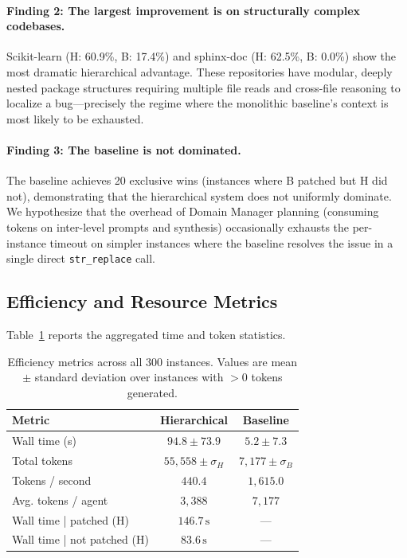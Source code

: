 \paragraph{Finding 2: The largest improvement is on structurally complex codebases.}
Scikit-learn (H: 60.9\%, B: 17.4\%) and sphinx-doc (H: 62.5\%, B: 0.0\%)
show the most dramatic hierarchical advantage. These repositories have
modular, deeply nested package structures requiring multiple file reads
and cross-file reasoning to localize a bug---precisely the regime where
the monolithic baseline's context is most likely to be exhausted.

\paragraph{Finding 3: The baseline is not dominated.}
The baseline achieves 20 exclusive wins (instances where B patched but H
did not), demonstrating that the hierarchical system does not uniformly
dominate. We hypothesize that the overhead of Domain Manager planning
(consuming tokens on inter-level prompts and synthesis) occasionally
exhausts the per-instance timeout on simpler instances where the baseline
resolves the issue in a single direct \texttt{str\_replace} call.

\subsection{Efficiency and Resource Metrics}
\label{sec:results:efficiency}

Table~\ref{tab:efficiency} reports the aggregated time and token statistics.

\begin{table}[t]
\centering
\caption{Efficiency metrics across all 300 instances. Values are
mean $\pm$ standard deviation over instances with $>0$ tokens generated.}
\label{tab:efficiency}
\begin{tabular}{lcc}
\toprule
\textbf{Metric} & \textbf{Hierarchical} & \textbf{Baseline} \\
\midrule
Wall time (s)       & $94.8 \pm 73.9$ & $5.2 \pm 7.3$ \\
Total tokens        & $55{,}558 \pm \sigma_H$ & $7{,}177 \pm \sigma_B$ \\
Tokens / second     & $440.4$   & $1{,}615.0$ \\
Avg. tokens / agent & $3{,}388$ & $7{,}177$    \\
\midrule
Wall time | patched (H) & $146.7\,\text{s}$ & --- \\
Wall time | not patched (H) & $83.6\,\text{s}$ & --- \\
\bottomrule
\end{tabular}
\end{table}

